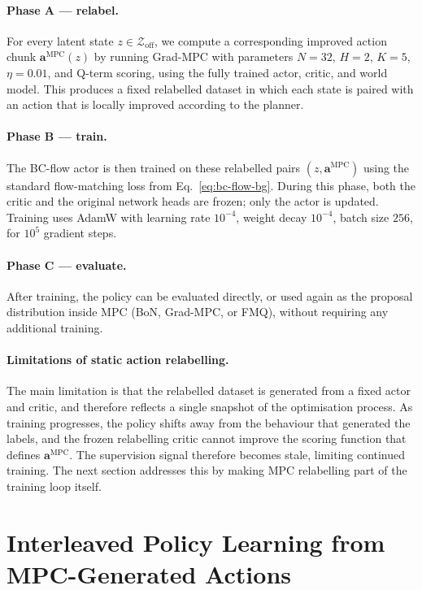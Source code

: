 \paragraph{Phase A --- relabel.}
For every latent state $z \in \mathcal{Z}_{\text{off}}$, we compute a
corresponding improved action chunk $\mathbf{a}^{\text{MPC}}(z)$ by
running Grad-MPC with parameters $N = 32$, $H = 2$, $K = 5$,
$\eta = 0.01$, and Q-term scoring, using the fully trained actor,
critic, and world model.
This produces a fixed relabelled dataset in which each state is paired
with an action that is locally improved according to the planner.

\paragraph{Phase B --- train.}
The BC-flow actor is then trained on these relabelled pairs
$(z, \mathbf{a}^{\text{MPC}})$ using the standard flow-matching loss
from Eq.~\eqref{eq:bc-flow-bg}. During this phase, both the critic
and the original network heads are frozen; only the actor is
updated. Training uses AdamW with learning rate $10^{-4}$, weight
decay $10^{-4}$, batch size $256$, for $10^5$ gradient steps.

\paragraph{Phase C --- evaluate.}
After training, the policy can be evaluated directly, or
used again as the proposal distribution inside MPC (BoN, Grad-MPC, or
FMQ), without requiring any additional training.

\paragraph{Limitations of static action relabelling.}
The main limitation is that the relabelled dataset is generated from a
fixed actor and critic, and therefore reflects a single snapshot of the
optimisation process.
As training progresses, the policy shifts away from the behaviour that
generated the labels, and the frozen relabelling critic cannot improve
the scoring function that defines $\mathbf{a}^{\text{MPC}}$. The
supervision signal therefore becomes stale, limiting continued training.
The next section addresses this by making MPC relabelling part of the
training loop itself.

\section{Interleaved Policy Learning from MPC-Generated Actions}
\label{sec:mpcd-interleaved}

